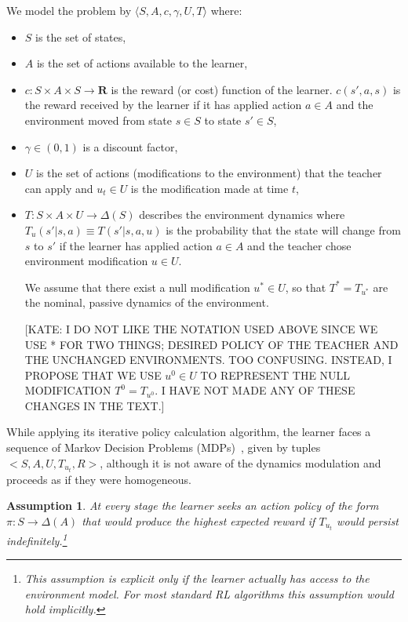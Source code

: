 \documentclass[letterpaper]{aamas2010}
\newtheorem{assume}{{\bf Assumption}}
\begin{document}
We model the problem by $\langle S, A, c,\gamma, U,T\rangle$ where:
\begin{itemize}
\item $S$ is the set of states, 
\item $A$ is the set of actions available to the learner,
\item  $c:S\times A\times S\rightarrow\mathbf{R}$ is the reward (or
  cost) function of the learner. $c(s',a,s)$ is the reward received by
  the learner if it has applied action $a\in A$ and the environment
  moved from state $s\in S$ to state $s'\in S$,
\item $\gamma \in (0,1)$ is a discount factor,   

\item $U$ is the set of actions (modifications to the environment)
  that the teacher can apply and $u_t\in U$ is the modification made
  at time $t$,

\item $T:S\times A\times U\rightarrow\Delta(S)$ describes the
  environment dynamics where $T_u(s'|s,a)\equiv T(s'|s,a,u)$ is the
  probability that the state will change from $s$ to $s'$ if the
  learner has applied action $a\in A$ and the teacher chose
  environment modification $u\in U$.

 
We assume that there exist a null
  modification $u^*\in U$, so that $T^*=T_{u^*}$ are the nominal,
  passive dynamics of the environment.
  
  [KATE: I DO NOT LIKE THE NOTATION USED ABOVE SINCE WE USE * FOR TWO THINGS;  
  DESIRED POLICY OF THE TEACHER AND THE UNCHANGED ENVIRONMENTS. TOO  
  CONFUSING.
  INSTEAD, I PROPOSE THAT WE USE $u^0\in U$ TO REPRESENT THE NULL MODIFICATION 
   $T^0=T_{u^0}$.  I HAVE NOT MADE ANY OF THESE CHANGES IN THE TEXT.]
\end{itemize}


While applying its iterative policy calculation algorithm, the learner
faces a sequence of Markov Decision Problems (MDPs)~\cite{puterman_book_94},
 given by tuples $<S,A,U,T_{u_t},R>$, although it is not aware of the dynamics
modulation and proceeds as if they were homogeneous. 
\begin{assume}\label{assume_persistence}
At every
stage the learner seeks an action policy of the form
$\pi:S\rightarrow\Delta(A)$ that would produce the highest expected
reward if $T_{u_t}$ would persist indefinitely.\footnote{This 
  assumption is explicit only if the learner actually has access to
  the environment model. For most standard RL algorithms this
  assumption would hold implicitly.}
\end{assume}
\end{document}
